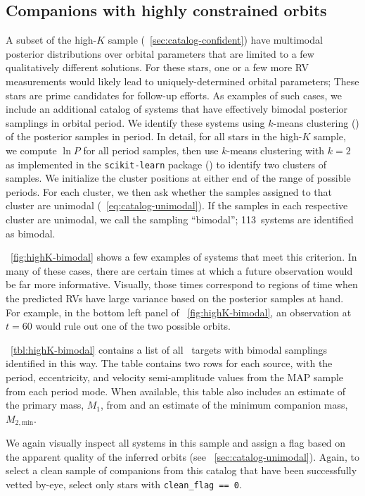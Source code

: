 \documentclass[modern, letterpaper]{aastex62}
\newcommand{\apogee}{\project{\acronym{APOGEE}}}
\newcommand{\nbimodal}{113}
\begin{document}
\subsection{Companions with highly constrained orbits}
\label{sec:catalog-multimodal}

A subset of the high-$K$ sample (\sectionname~\ref{sec:catalog-confident}) have
multimodal posterior distributions over orbital parameters that are limited to
a few qualitatively different solutions.
For these stars, one or a few more RV measurements would likely lead to
uniquely-determined orbital parameters; These stars are prime candidates for
follow-up efforts.
As examples of such cases, we include an additional catalog of systems that have
effectively bimodal posterior samplings in orbital period.
We identify these systems using $k$-means clustering (\citealt{Lloyd:1982}) of
the posterior samples in period.
In detail, for all stars in the high-$K$ sample, we compute $\ln P$ for all
period samples, then use $k$-means clustering with $k=2$ as implemented in the
\texttt{scikit-learn} package (\citealt{Pedregosa:2011}) to identify two
clusters of samples.
We initialize the cluster positions at either end of the range of possible
periods.
For each cluster, we then ask whether the samples assigned to that cluster are
unimodal (\eqname~\ref{eq:catalog-unimodal}).
If the samples in each respective cluster are unimodal, we call the sampling
``bimodal''; \nbimodal\ systems are identified as bimodal.

\figurename~\ref{fig:highK-bimodal} shows a few examples of systems that meet
this criterion.
In many of these cases, there are certain times at which a future observation
would be far more informative.
Visually, those times correspond to regions of time when the predicted RVs have
large variance based on the posterior samples at hand.
For example, in the bottom left panel of \figurename~\ref{fig:highK-bimodal}, an
observation at $t = 60$ would rule out one of the two possible orbits.

\tablename~\ref{tbl:highK-bimodal} contains a list of all \apogee\ targets with
bimodal samplings identified in this way.
The table contains two rows for each source, with the period, eccentricity, and
velocity semi-amplitude values from the MAP sample from each period mode.
When available, this table also includes an estimate of the primary mass, $M_1$,
from \citet{Ness:2015} and an estimate of the minimum companion mass, $M_{2,
\textrm{min}}$.

We again visually inspect all systems in this sample and assign a flag based on
the apparent quality of the inferred orbits (see
\sectionname~\ref{sec:catalog-unimodal}).
Again, to select a clean sample of companions from this catalog that have been
successfully vetted by-eye, select only stars with \texttt{clean\_flag == 0}.
\end{document}
